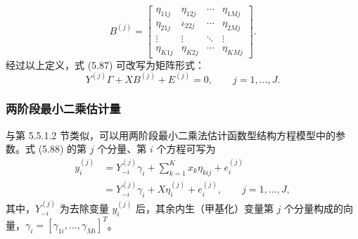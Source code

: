 \[
B^{(j)}=\begin{bmatrix}
\eta_{11j}&\eta_{12j}&\cdots&\eta_{1Mj}\\
\eta_{21j}&\iota_{22j}&\cdots&\eta_{2Mj}\\
\vdots&\vdots&\ddots&\vdots\\
\eta_{K1j}&\eta_{K2j}&\cdots&\eta_{KMj}
\end{bmatrix}.
\]
经过以上定义，式 (5.87) 可改写为矩阵形式：
\begin{equation}
Y^{(j)}\Gamma+XB^{(j)}+E^{(j)}=0,\qquad j=1,\ldots,J.
\tag{5.88}
\end{equation}

\subsubsection{两阶段最小二乘估计量}

与第 5.5.1.2 节类似，可以用两阶段最小二乘法估计函数型结构方程模型中的参数。式 (5.88) 的第 $j$ 个分量、第 $i$ 个方程可写为
\begin{equation}
\begin{aligned}
y_i^{(j)}&=Y_{-i}^{(j)}\gamma_i+\sum_{k=1}^Kx_k\eta_{kij}+e_i^{(j)}\\
&=Y_{-i}^{(j)}\gamma_i+X\eta_i^{(j)}+e_i^{(j)},\qquad j=1,\ldots,J,
\end{aligned}
\tag{5.89}
\end{equation}
其中，$Y_{-i}^{(j)}$ 为去除变量 $y_i^{(j)}$ 后，其余内生（甲基化）变量第 $j$ 个分量构成的向量，$\gamma_i=[\gamma_{1i},\ldots,\gamma_{Mi}]^T$。

